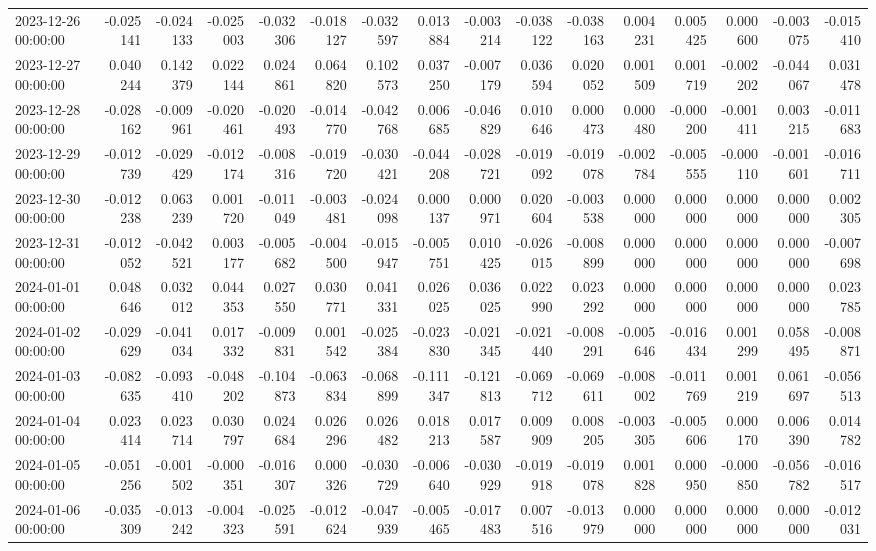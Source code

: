 \begin{tabular}{lrrrrrrrrrrrrrrr}
2023-12-26 00:00:00 & -0.025141 & -0.024133 & -0.025003 & -0.032306 & -0.018127 & -0.032597 & 0.013884 & -0.003214 & -0.038122 & -0.038163 & 0.004231 & 0.005425 & 0.000600 & -0.003075 & -0.015410 \\
2023-12-27 00:00:00 & 0.040244 & 0.142379 & 0.022144 & 0.024861 & 0.064820 & 0.102573 & 0.037250 & -0.007179 & 0.036594 & 0.020052 & 0.001509 & 0.001719 & -0.002202 & -0.044067 & 0.031478 \\
2023-12-28 00:00:00 & -0.028162 & -0.009961 & -0.020461 & -0.020493 & -0.014770 & -0.042768 & 0.006685 & -0.046829 & 0.010646 & 0.000473 & 0.000480 & -0.000200 & -0.001411 & 0.003215 & -0.011683 \\
2023-12-29 00:00:00 & -0.012739 & -0.029429 & -0.012174 & -0.008316 & -0.019720 & -0.030421 & -0.044208 & -0.028721 & -0.019092 & -0.019078 & -0.002784 & -0.005555 & -0.000110 & -0.001601 & -0.016711 \\
2023-12-30 00:00:00 & -0.012238 & 0.063239 & 0.001720 & -0.011049 & -0.003481 & -0.024098 & 0.000137 & 0.000971 & 0.020604 & -0.003538 & 0.000000 & 0.000000 & 0.000000 & 0.000000 & 0.002305 \\
2023-12-31 00:00:00 & -0.012052 & -0.042521 & 0.003177 & -0.005682 & -0.004500 & -0.015947 & -0.005751 & 0.010425 & -0.026015 & -0.008899 & 0.000000 & 0.000000 & 0.000000 & 0.000000 & -0.007698 \\
2024-01-01 00:00:00 & 0.048646 & 0.032012 & 0.044353 & 0.027550 & 0.030771 & 0.041331 & 0.026025 & 0.036025 & 0.022990 & 0.023292 & 0.000000 & 0.000000 & 0.000000 & 0.000000 & 0.023785 \\
2024-01-02 00:00:00 & -0.029629 & -0.041034 & 0.017332 & -0.009831 & 0.001542 & -0.025384 & -0.023830 & -0.021345 & -0.021440 & -0.008291 & -0.005646 & -0.016434 & 0.001299 & 0.058495 & -0.008871 \\
2024-01-03 00:00:00 & -0.082635 & -0.093410 & -0.048202 & -0.104873 & -0.063834 & -0.068899 & -0.111347 & -0.121813 & -0.069712 & -0.069611 & -0.008002 & -0.011769 & 0.001219 & 0.061697 & -0.056513 \\
2024-01-04 00:00:00 & 0.023414 & 0.023714 & 0.030797 & 0.024684 & 0.026296 & 0.026482 & 0.018213 & 0.017587 & 0.009909 & 0.008205 & -0.003305 & -0.005606 & 0.000170 & 0.006390 & 0.014782 \\
2024-01-05 00:00:00 & -0.051256 & -0.001502 & -0.000351 & -0.016307 & 0.000326 & -0.030729 & -0.006640 & -0.030929 & -0.019918 & -0.019078 & 0.001828 & 0.000950 & -0.000850 & -0.056782 & -0.016517 \\
2024-01-06 00:00:00 & -0.035309 & -0.013242 & -0.004323 & -0.025591 & -0.012624 & -0.047939 & -0.005465 & -0.017483 & 0.007516 & -0.013979 & 0.000000 & 0.000000 & 0.000000 & 0.000000 & -0.012031 \\

\end{tabular}
